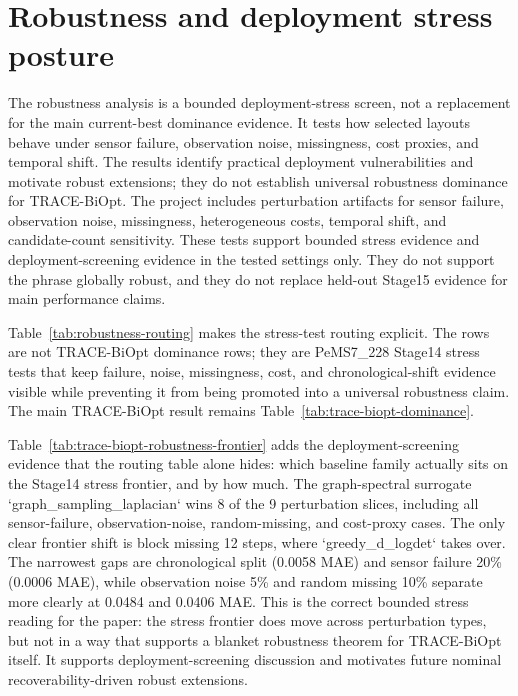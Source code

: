\section{Robustness and deployment stress posture}
\label{sec:robustness}

The robustness analysis is a bounded deployment-stress screen, not a
replacement for the main current-best dominance evidence. It tests how selected
layouts behave under sensor failure, observation noise, missingness, cost
proxies, and temporal shift. The results identify practical deployment
vulnerabilities and motivate robust extensions; they do not establish universal
robustness dominance for TRACE-BiOpt. The project includes perturbation
artifacts for sensor failure, observation noise, missingness, heterogeneous
costs, temporal shift, and candidate-count sensitivity. These tests support
bounded stress evidence and deployment-screening evidence in the tested
settings only. They do not support the phrase globally robust, and they do not
replace held-out Stage15 evidence for main performance claims.


\FloatBarrier

Table~\ref{tab:robustness-routing} makes the stress-test routing explicit. The
rows are not TRACE-BiOpt dominance rows; they are PeMS7\_228 Stage14 stress
tests that keep failure, noise, missingness, cost, and chronological-shift
evidence visible while preventing it from being promoted into a universal
robustness claim. The main TRACE-BiOpt result remains
Table~\ref{tab:trace-biopt-dominance}.


\FloatBarrier

Table~\ref{tab:trace-biopt-robustness-frontier} adds the deployment-screening
evidence that the routing table alone hides: which baseline family actually sits
on the Stage14 stress frontier, and by how much. The graph-spectral surrogate
`graph\_sampling\_laplacian` wins 8 of the 9 perturbation slices, including all
sensor-failure, observation-noise, random-missing, and cost-proxy cases. The
only clear frontier shift is block missing 12 steps, where `greedy\_d\_logdet`
takes over. The narrowest gaps are chronological split (0.0058 MAE) and sensor
failure 20\% (0.0006 MAE), while observation noise 5\% and random missing 10\%
separate more clearly at 0.0484 and 0.0406 MAE. This is the correct bounded
stress reading for the paper: the stress frontier does move across perturbation
types, but not in a way that supports a blanket robustness theorem for
TRACE-BiOpt itself. It supports deployment-screening discussion and motivates
future nominal recoverability-driven robust extensions.

